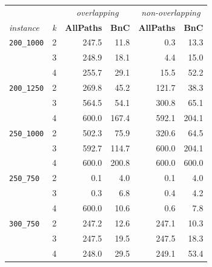 \documentclass[conference]{IEEEtran}
\begin{document}
\begin{table}
\centering
\captionsetup{font=small}
\label{table:runtime}

\begin{tabular}{|ll|rr|rr|}
\hline
		 &   &  \multicolumn{2}{|c|}{\emph{overlapping}} & \multicolumn{2}{|c|}{\emph{non-overlapping}} \\
         \cline{3-6}
\emph{instance} & \emph{k} &  \textbf{AllPaths} &  \textbf{BnC} &  \textbf{AllPaths} &  \textbf{BnC} \\
\hline      
\texttt{200\_1000} & 2 &     247.5 &    11.8 &       0.3 &    13.3 \\
         & 3 &     248.9 &    18.1 &       4.4 &    15.0 \\
         & 4 &     255.7 &    29.1 &      15.5 &    52.2 \\
\hline
\texttt{200\_1250} & 2 &     269.8 &    45.2 &     121.7 &    38.3 \\
         & 3 &     564.5 &    54.1 &     300.8 &    65.1 \\
         & 4 &         600.0  &   167.4 &     592.1 &   204.1 \\
\hline                             
\texttt{250\_1000} & 2 &     502.3 &    75.9 &     320.6 &    64.5 \\
         & 3 &     592.7 &   114.7 &     600.0       &   204.1 \\
         & 4 &         600.0  &   200.8 &         600.0   &       600.0   \\
\hline
\texttt{250\_750} & 2 &       0.1 &     4.0 &       0.1 &     4.0 \\
         & 3 &       0.3 &     6.8 &       0.4 &     4.2 \\
         & 4 &       600.0    &    10.6 &       0.6 &     7.8 \\
\hline
\texttt{300\_750} & 2 &     247.2 &    12.6 &     247.1 &    10.3 \\
         & 3 &     247.5 &    19.5 &     247.5 &    18.3 \\
         & 4 &     248.0 &    29.5 &     249.1 &    53.4 \\

\end{tabular}
\end{table}
\end{document}
